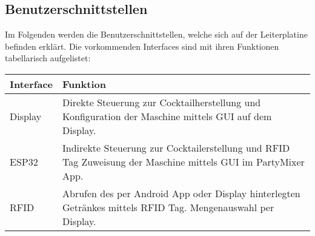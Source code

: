 \clearpage
\subsection{Benutzerschnittstellen}
\label{subsec:Benutzerschnittstellen}

Im Folgenden werden die Benutzerschnittstellen, welche sich auf der Leiterplatine befinden erklärt. Die vorkommenden Interfaces sind mit ihren Funktionen tabellarisch aufgelistet:

\begin{tabularx}{\textwidth}{|l|X|}
\hline
\textbf{Interface} & \textbf{Funktion}\\
\hline
Display & Direkte Steuerung zur Cocktailherstellung und Konfiguration der Maschine mittels GUI auf dem Display. \\
\hline
ESP32 & Indirekte Steuerung zur Cocktailerstellung und RFID Tag Zuweisung der Maschine mittels GUI im PartyMixer App.\\
\hline
RFID & Abrufen des per Android App oder Display hinterlegten Getränkes mittels RFID Tag. Mengenauswahl per Display.\\
\hline
\end{tabularx}

 